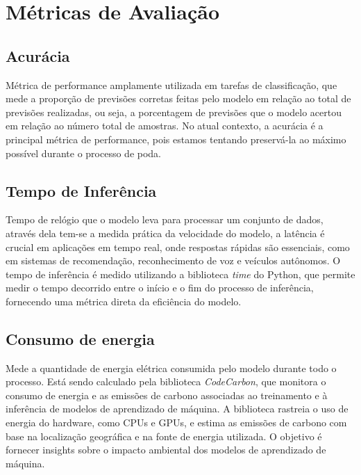 \section{Métricas de Avaliação}
\subsection{Acurácia}
Métrica de performance amplamente utilizada em tarefas de classificação, que mede a proporção de previsões corretas feitas pelo modelo em relação ao total de previsões realizadas, ou seja, a porcentagem de previsões que o modelo acertou em relação ao número total de amostras. No atual contexto, a acurácia é a principal métrica de performance, pois estamos tentando preservá-la ao máximo possível durante o processo de poda.
\subsection{Tempo de Inferência}
Tempo de relógio que o modelo leva para processar um conjunto de dados, através dela tem-se a medida prática da velocidade do modelo, a latência é crucial em aplicações em tempo real, onde respostas rápidas são essenciais, como em sistemas de recomendação, reconhecimento de voz e veículos autônomos. O tempo de inferência é medido utilizando a biblioteca \textit{time} do Python, que permite medir o tempo decorrido entre o início e o fim do processo de inferência, fornecendo uma métrica direta da eficiência do modelo.
\subsection{Consumo de energia}
Mede a quantidade de energia elétrica consumida pelo modelo durante todo o processo. Está sendo calculado pela biblioteca \textit{CodeCarbon}, que monitora o consumo de energia e as emissões de carbono associadas ao treinamento e à inferência de modelos de aprendizado de máquina. A biblioteca rastreia o uso de energia do hardware, como CPUs e GPUs, e estima as emissões de carbono com base na localização geográfica e na fonte de energia utilizada. O objetivo é fornecer insights sobre o impacto ambiental dos modelos de aprendizado de máquina.
